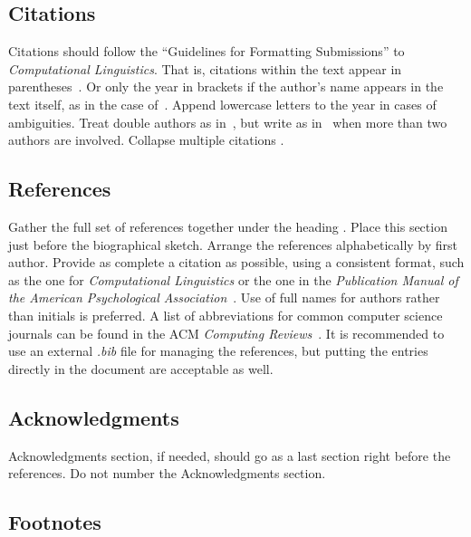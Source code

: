 \documentclass[10pt, a4paper]{article}
\begin{document}
\subsection{Citations}
\label{subsec:citations}

Citations should follow the \enquote{Guidelines for Formatting Submissions} to \emph{Computational Linguistics}.
That is, citations within the text appear in parentheses~\citep{gusfield1997algorithms}.
Or only the year in brackets if the author's name appears in the text itself, as in the case of~\citet{gusfield1997algorithms}.
Append lowercase letters to the year in cases of ambiguities.
Treat double authors as in~\citet{aho1972theory}, but write as in~\citet{chandra1981embedded} when more than two authors are involved.
Collapse multiple citations \citep{wagner1974string, chandra1981embedded}.

\subsection{References}
\label{subsec:references}

Gather the full set of references together under the
heading \textbf{}.
Place this section just before the biographical sketch.
Arrange the references alphabetically by first author.
Provide as complete a citation as possible, using a consistent format, such as the one for \emph{Computational
Linguistics} or the one in the {\emph{Publication Manual of the American 
Psychological Association}~\citep{american1994publication}}.
Use of full names for authors rather than initials is preferred.
A list of abbreviations for common computer science journals can be found in the ACM \emph{Computing
Reviews}~\citep{american1994publication}.
It is recommended to use an external \textit{.bib} file for managing the references, but putting the entries directly in the document are acceptable as well.

\subsection{Acknowledgments}
\label{subsec:acknowledgments}

Acknowledgments section, if needed, should go as a last section right before the references. Do not number the Acknowledgments section.

\subsection{Footnotes}
\label{subsec:footnotes}
\end{document}
